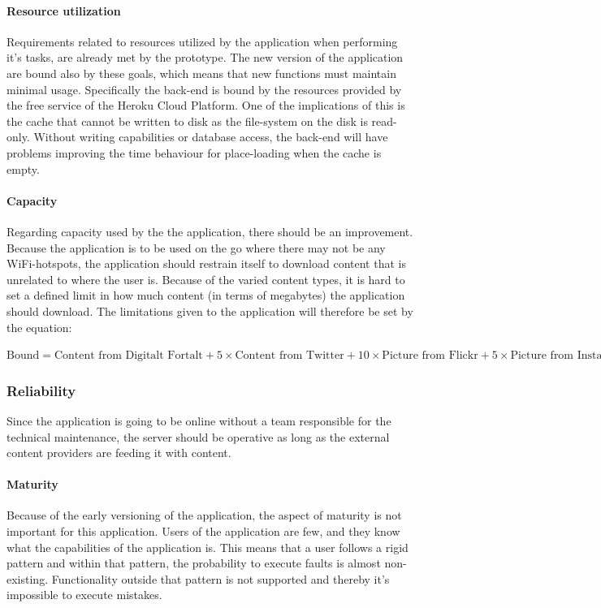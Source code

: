 \paragraph{Resource utilization}
Requirements related to resources utilized by the application when performing it's tasks, are already met by the prototype. The new version of the application are bound also by these goals, which means that new functions must maintain minimal usage. Specifically the back-end is bound by the resources provided by the free service of the Heroku Cloud Platform. One of the implications of this is the cache that cannot be written to disk as the file-system on the disk is read-only. Without writing capabilities or database access, the back-end will have problems improving the time behaviour for place-loading when the cache is empty.

\paragraph{Capacity}

Regarding capacity used by the the application, there should be an improvement. Because the application is to be used on the go where there may not be any WiFi-hotspots, the application should restrain itself to download content that is unrelated to where the user is. Because of the varied content types, it is hard to set a defined limit in how much content (in terms of megabytes) the application should download. The limitations given to the application will therefore be set by the equation: \\ 
\begin{center} 
$\textrm{Bound}=\textrm{Content from Digitalt Fortalt}+5\times\textrm{Content from Twitter}+10\times\textrm{Picture from Flickr}+5\times\textrm{Picture from Instagram}$
\begin{equation}
\label{eq:DownloadLimit}
\end{equation}
\end{center}

\subsubsection{Reliability}
Since the application is going to be online without a team responsible for the technical maintenance, the server should be operative as long as the external content providers are feeding it with content. 

\paragraph{Maturity}
Because of the early versioning of the application, the aspect of maturity is not important for this application. Users of the application are few, and they know what the capabilities of the application is. This means that a user follows a rigid pattern and within that pattern, the probability to execute faults is almost non-existing. Functionality outside that pattern is not supported and thereby it's impossible to execute mistakes.

